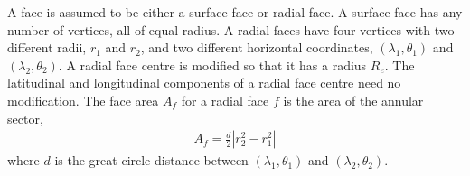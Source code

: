 A face is assumed to be either a surface face or radial face.
A surface face has any number of vertices, all of equal radius.
A radial faces have four vertices with two different radii, $r_1$ and $r_2$, and two different horizontal coordinates, $(\lambda_1, \theta_1)$ and $(\lambda_2, \theta_2)$.
A radial face centre is modified so that it has a radius $R_e$.  The latitudinal and longitudinal components of a radial face centre need no modification. 
The face area $A_f$ for a radial face $f$ is the area of the annular sector,
\begin{align}
	A_f = \frac{d}{2} \left\lvert r_2^2 - r_1^2 \right\rvert
\end{align}
where $d$ is the great-circle distance between $(\lambda_1, \theta_1)$ and $(\lambda_2, \theta_2)$.

